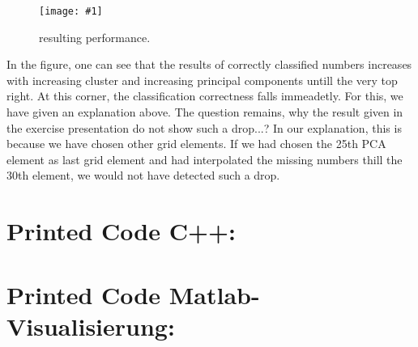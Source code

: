 \documentclass[a4paper,headings=small]{scrartcl}
\numberwithin{equation}{section} %
\numberwithin{figure}{section}   %
\newcommand{\image}[3]{
	\begin{figure}[htbp]
		\centering
		\texttt{[image: \#1]}
		\caption{#3}
		\label{fig:#1}
	\end{figure}
}
\newcommand{\imgGeneratedRoot}{../../../target/pics}
\begin{document}
\image{\imgGeneratedRoot/PerformanceAnalysation.jpg}{0.8}{%
		resulting performance.}

In the figure, one can see that the results of correctly classified numbers increases with increasing
cluster and increasing principal components untill the very top right.
At this corner, the classification correctness falls immeadetly. 
For this, we have given an explanation above. 
The question remains, why the result given in the exercise presentation do not show such a drop...?
In our explanation, this is because we have chosen other grid elements.
If we had chosen the 25th PCA element as last grid element and had interpolated the missing
numbers thill the 30th element, we would not have detected such a drop.

\newpage
\section{Printed Code C++:}



\newpage
\section{Printed Code Matlab-Visualisierung:}


\end{document}

